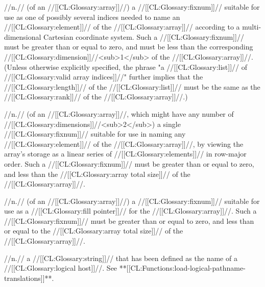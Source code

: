  //n.// (of an //[[CL:Glossary:array]]//) a //[[CL:Glossary:fixnum]]// suitable for use as one of possibly several indices needed to name an //[[CL:Glossary:element]]// of the //[[CL:Glossary:array]]// according to a multi-dimensional Cartesian coordinate system. Such a //[[CL:Glossary:fixnum]]// must be greater than or equal to zero, and must be less than the corresponding //[[CL:Glossary:dimension]]//<sub>1</sub> of the //[[CL:Glossary:array]]//. (Unless otherwise explicitly specified, the phrase "a //[[CL:Glossary:list]]// of //[[CL:Glossary:valid array indices]]//" further implies that the //[[CL:Glossary:length]]// of the //[[CL:Glossary:list]]// must be the same as the //[[CL:Glossary:rank]]// of the //[[CL:Glossary:array]]//.) 

 //n.// (of an //[[CL:Glossary:array]]//, which might have any number of //[[CL:Glossary:dimensions]]//<sub>2</sub>) a single //[[CL:Glossary:fixnum]]// suitable for use in naming any //[[CL:Glossary:element]]// of the //[[CL:Glossary:array]]//, by viewing the array's storage as a linear series of //[[CL:Glossary:elements]]// in row-major order. Such a //[[CL:Glossary:fixnum]]// must be greater than or equal to zero, and less than the //[[CL:Glossary:array total size]]// of the //[[CL:Glossary:array]]//.

 //n.// (of an //[[CL:Glossary:array]]//) a //[[CL:Glossary:fixnum]]// suitable for use as a //[[CL:Glossary:fill pointer]]// for the //[[CL:Glossary:array]]//. Such a //[[CL:Glossary:fixnum]]// must be greater than or equal to zero, and less than or equal to the //[[CL:Glossary:array total size]]// of the //[[CL:Glossary:array]]//.



 //n.// a //[[CL:Glossary:string]]// that has been defined as the name of a //[[CL:Glossary:logical host]]//. See **[[CL:Functions:load-logical-pathname-translations]]**.

